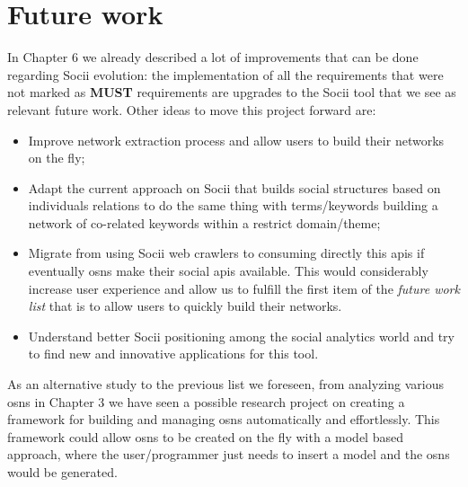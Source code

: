 \section{Future work}
In Chapter 6 we already described a lot of improvements that can be done regarding Socii evolution: the implementation of all the requirements that were not marked as \textbf{MUST} requirements are upgrades to the Socii tool that we see as relevant future work. Other ideas to move this project forward are:

\begin{itemize}
    \item Improve network extraction process and allow users to build their networks on the fly;
    \item Adapt the current approach on Socii that builds social structures based on individuals relations to do the same thing with terms/keywords
    building a network of co-related keywords within a restrict domain/theme;
    \item Migrate from using Socii web crawlers to consuming directly this \glspl{api} if eventually \glspl{osn} make their social \glspl{api} available. This would considerably increase user experience and allow us to fulfill the first item of the \textit{future work list} that is to allow users to quickly build their networks.
    \item Understand better Socii positioning among the social analytics world and try to find new and innovative applications for this tool.
\end{itemize}

As an alternative study to the previous list we foreseen, from analyzing various \glspl{osn} in Chapter 3 we have seen a possible research project on creating a framework for building and managing \glspl{osn} automatically and effortlessly. This framework could allow \glspl{osn} to be created on the fly with a model based approach, where the user/programmer just needs to insert a model and the \glspl{osn} would be generated.

